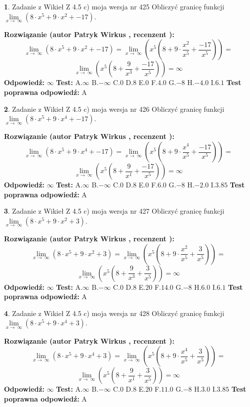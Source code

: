 \documentclass[12pt, a4paper]{article}
\theoremstyle{definition} %
\newtheorem{zad}{}
\newcommand{\zadStart}[1]{\begin{zad}#1\newline}
\newcommand{\zadStop}{\end{zad}}
\newcommand{\rozwStart}[2]{\noindent \textbf{Rozwiązanie (autor #1 , recenzent #2): }\newline}
\newcommand{\rozwStop}{\newline}
\newcommand{\odpStart}{\noindent \textbf{Odpowiedź:}\newline}
\newcommand{\odpStop}{\newline}
\newcommand{\testStart}{\noindent \textbf{Test:}\newline}
\newcommand{\testStop}{\newline}
\newcommand{\kluczStart}{\noindent \textbf{Test poprawna odpowiedź:}\newline}
\newcommand{\kluczStop}{\newline}
\begin{document}
\zadStart{Zadanie z Wikieł Z 4.5 c) moja wersja nr 425}
Obliczyć granicę funkcji  $\lim\limits_{x\to\ \infty}(8 \cdot x^{5}+9 \cdot x^{2}+-17)$.
\zadStop
\rozwStart{Patryk Wirkus}{}
$$\lim\limits_{x\to\ \infty}(8 \cdot x^{5}+9 \cdot x^{2}+-17) = \lim\limits_{x\to\ \infty}(x^{5}(8 +9 \cdot \frac{x^{2}}{x^{5}}+\frac{-17}{x^{5}})) =$$ $$\lim\limits_{x\to\ \infty}(x^{5}(8 +\frac{9}{x^{3}}+\frac{-17}{x^{5}})) =\infty$$
\rozwStop
\odpStart
$\infty$
\odpStop
\testStart
A.$\infty$ B.$-\infty$ C.$0$ D.$8$ E.$0$
F.$4.0$ G.$-8$
H.$-4.0$
I.$6.1$
\testStop
\kluczStart
A
\kluczStop



\zadStart{Zadanie z Wikieł Z 4.5 c) moja wersja nr 426}
Obliczyć granicę funkcji  $\lim\limits_{x\to\ \infty}(8 \cdot x^{5}+9 \cdot x^{4}+-17)$.
\zadStop
\rozwStart{Patryk Wirkus}{}
$$\lim\limits_{x\to\ \infty}(8 \cdot x^{5}+9 \cdot x^{4}+-17) = \lim\limits_{x\to\ \infty}(x^{5}(8 +9 \cdot \frac{x^{4}}{x^{5}}+\frac{-17}{x^{5}})) =$$ $$\lim\limits_{x\to\ \infty}(x^{5}(8 +\frac{9}{x^{1}}+\frac{-17}{x^{5}})) =\infty$$
\rozwStop
\odpStart
$\infty$
\odpStop
\testStart
A.$\infty$ B.$-\infty$ C.$0$ D.$8$ E.$0$
F.$6.0$ G.$-8$
H.$-2.0$
I.$3.85$
\testStop
\kluczStart
A
\kluczStop



\zadStart{Zadanie z Wikieł Z 4.5 c) moja wersja nr 427}
Obliczyć granicę funkcji  $\lim\limits_{x\to\ \infty}(8 \cdot x^{5}+9 \cdot x^{2}+3)$.
\zadStop
\rozwStart{Patryk Wirkus}{}
$$\lim\limits_{x\to\ \infty}(8 \cdot x^{5}+9 \cdot x^{2}+3) = \lim\limits_{x\to\ \infty}(x^{5}(8 +9 \cdot \frac{x^{2}}{x^{5}}+\frac{3}{x^{5}})) =$$ $$\lim\limits_{x\to\ \infty}(x^{5}(8 +\frac{9}{x^{3}}+\frac{3}{x^{5}})) =\infty$$
\rozwStop
\odpStart
$\infty$
\odpStop
\testStart
A.$\infty$ B.$-\infty$ C.$0$ D.$8$ E.$20$
F.$14.0$ G.$-8$
H.$6.0$
I.$6.1$
\testStop
\kluczStart
A
\kluczStop



\zadStart{Zadanie z Wikieł Z 4.5 c) moja wersja nr 428}
Obliczyć granicę funkcji  $\lim\limits_{x\to\ \infty}(8 \cdot x^{5}+9 \cdot x^{4}+3)$.
\zadStop
\rozwStart{Patryk Wirkus}{}
$$\lim\limits_{x\to\ \infty}(8 \cdot x^{5}+9 \cdot x^{4}+3) = \lim\limits_{x\to\ \infty}(x^{5}(8 +9 \cdot \frac{x^{4}}{x^{5}}+\frac{3}{x^{5}})) =$$ $$\lim\limits_{x\to\ \infty}(x^{5}(8 +\frac{9}{x^{1}}+\frac{3}{x^{5}})) =\infty$$
\rozwStop
\odpStart
$\infty$
\odpStop
\testStart
A.$\infty$ B.$-\infty$ C.$0$ D.$8$ E.$20$
F.$11.0$ G.$-8$
H.$3.0$
I.$3.85$
\testStop
\kluczStart
A
\kluczStop
\end{document}
